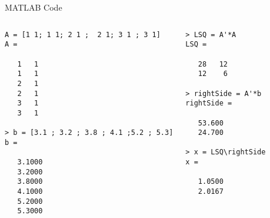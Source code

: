 \documentclass[svgnames,table,,aspectratio=169]{beamer}
\begin{document}
\begin{frame}[fragile]{MATLAB Code}
  \lstset{basicstyle=\tiny\ttfamily,breaklines=true}
  \lstset{framextopmargin=50pt,frame=bottomline}

  \begin{columns}

    \begin{lstlisting}
A = [1 1; 1 1; 2 1 ;  2 1; 3 1 ; 3 1]
A =

   1   1
   1   1
   2   1
   2   1
   3   1
   3   1

> b = [3.1 ; 3.2 ; 3.8 ; 4.1 ;5.2 ; 5.3]
b =

   3.1000
   3.2000
   3.8000
   4.1000
   5.2000
   5.3000

\end{lstlisting}


\begin{lstlisting}
> LSQ = A'*A
LSQ =

   28   12
   12    6

> rightSide = A'*b
rightSide =

   53.600
   24.700

> x = LSQ\rightSide 
x =

   1.0500
   2.0167

\end{lstlisting}

  \end{columns}
\end{frame}
\end{document}
